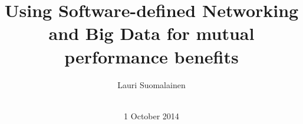 \documentclass{acm_proc_article-sp}
\begin{document}
\title{Using Software-defined Networking and Big Data for mutual performance benefits}

%
%
%
%
%

%
\author{
%
%
\alignauthor Lauri Suomalainen \\
\\
}       




\date{1 October 2014}

\maketitle
\end{document}
